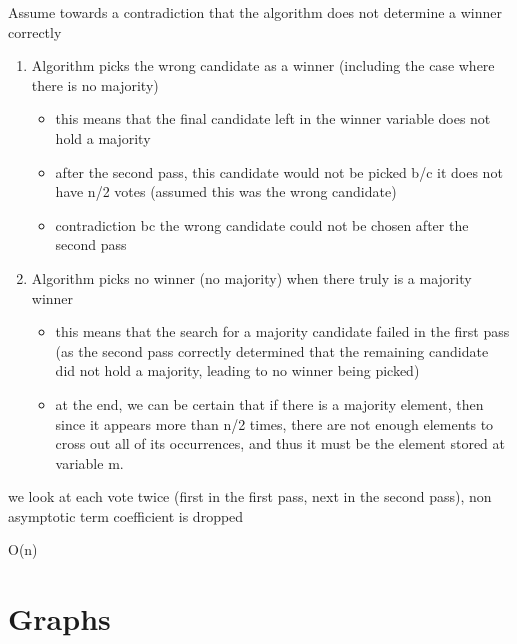 {
    \item Assume towards a contradiction that the algorithm does not determine a winner correctly
    \begin{enumerate}
        \item Algorithm picks the wrong candidate as a winner (including the case where there is no majority)
        \begin{itemize}
            \item this means that the final candidate left in the winner variable does not hold a majority
            \item after the second pass, this candidate would not be picked b/c it does not have n/2 votes (assumed this was the wrong candidate)
            \item contradiction bc the wrong candidate could not be chosen after the second pass
        \end{itemize}
        \item Algorithm picks no winner (no majority) when there truly is a majority winner
        \begin{itemize}
            \item this means that the search for a majority candidate failed in the first pass (as the second pass correctly determined that the remaining candidate did not hold a majority, leading to no winner being picked)
            \item at the end, we can be certain that if there is a majority element, then since it appears more than n/2 times, there are not enough elements to cross out all of its occurrences, and thus it must be the element stored at variable m.
        \end{itemize}

    \end{enumerate}

}
{
    \item we look at each vote twice (first in the first pass, next in the second pass), non asymptotic term coefficient  is dropped 
    \item O(n)
}




\chapter{Graphs}


